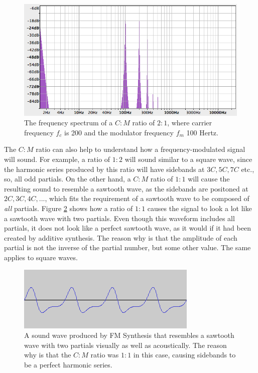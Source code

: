   \begin{figure}[]
    \includegraphics[scale=0.5]{img/sb}
    \caption{The frequency spectrum of a $C:M$ ratio of $2:1$, where carrier frequency $f_{c}$ is 200 and the modulator frequency $f_{m}$ 100 Hertz.}
    \label{fig:sb}
  \end{figure}

  \pagebreak

  \noindent The $C:M$ ratio can also help to understand how a frequency-modulated signal will sound. For example, a ratio of $1:2$ will sound similar to a square wave, since the harmonic series produced by this ratio will have sidebands at $3C, 5C, 7C$ etc., so, all odd partials. On the other hand, a $C:M$ ratio of $1:1$ will cause the resulting sound to resemble a sawtooth wave, as the sidebands are positoned at $2C, 3C, 4C, ...$, which fits the requirement of a sawtooth wave to be composed of \emph{all} partials. Figure \ref{fig:fmsaw} shows how a ratio of $1:1$ causes the signal to look a lot like a sawtooth wave with two partials. Even though this waveform includes all partials, it does not look like a perfect sawtooth wave, as it would if it had been created by additive synthesis. The reason why is that the amplitude of each partial is not the inverse of the partial number, but some other value. The same applies to square waves.\\

  \begin{figure}[]
    \includegraphics[scale=0.7]{img/fmsaw}
    \caption{A sound wave produced by FM Synthesis that resembles a sawtooth wave with two partials visually as well as acoustically. The reason why is that the $C:M$ ratio was $1:1$ in this case, causing sidebands to be a perfect harmonic series.}
    \label{fig:fmsaw}
  \end{figure}

